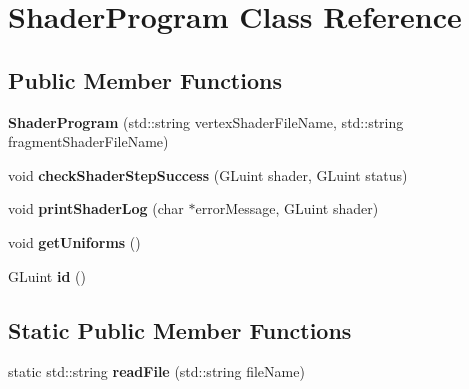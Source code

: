 \hypertarget{classShaderProgram}{}\section{Shader\+Program Class Reference}
\label{classShaderProgram}
\subsection*{Public Member Functions}
\begin{DoxyCompactItemize}
\item 
\hypertarget{classShaderProgram_a1ebd997652d664bb4cfad4327dfc0ebf}{}{\bfseries Shader\+Program} (std\+::string vertex\+Shader\+File\+Name, std\+::string fragment\+Shader\+File\+Name)\label{classShaderProgram_a1ebd997652d664bb4cfad4327dfc0ebf}

\item 
\hypertarget{classShaderProgram_a266426e0200266b6776e8a5a8b1506b0}{}void {\bfseries check\+Shader\+Step\+Success} (G\+Luint shader, G\+Luint status)\label{classShaderProgram_a266426e0200266b6776e8a5a8b1506b0}

\item 
\hypertarget{classShaderProgram_ab9aaa0cdb43bd9de8a370e2869354a8a}{}void {\bfseries print\+Shader\+Log} (char $\ast$error\+Message, G\+Luint shader)\label{classShaderProgram_ab9aaa0cdb43bd9de8a370e2869354a8a}

\item 
\hypertarget{classShaderProgram_ac1a9ea8318b9ad795b93f2d5e1d4aae2}{}void {\bfseries get\+Uniforms} ()\label{classShaderProgram_ac1a9ea8318b9ad795b93f2d5e1d4aae2}

\item 
\hypertarget{classShaderProgram_a190a33eec6ed3138a6d94a7305a9e831}{}G\+Luint {\bfseries id} ()\label{classShaderProgram_a190a33eec6ed3138a6d94a7305a9e831}

\end{DoxyCompactItemize}
\subsection*{Static Public Member Functions}
\begin{DoxyCompactItemize}
\item 
\hypertarget{classShaderProgram_ab0705c01246e6a70e8c3bc278666b2d0}{}static std\+::string {\bfseries read\+File} (std\+::string file\+Name)\label{classShaderProgram_ab0705c01246e6a70e8c3bc278666b2d0}

\end{DoxyCompactItemize}
